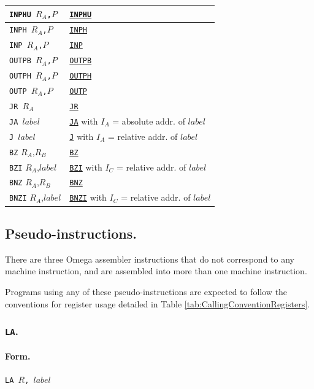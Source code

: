 \documentclass[12pt,english,twoside]{report}
\def\code{\texttt}
\newcommand\machineinst[1]{\hyperref[sec:Ins_#1]{\code{#1}}}
\begin{document}
\begin{center}
\begin{longtable}{l|l}
      \hline
      \code{INPHU $R_A$,$P$} & \machineinst{INPHU}\\
      \hline
      \code{INPH $R_A$,$P$} & \machineinst{INPH}\\
      \hline
      \code{INP $R_A$,$P$} & \machineinst{INP}\\
      \hline
      \code{OUTPB $R_A$,$P$} & \machineinst{OUTPB}\\
      \hline
      \code{OUTPH $R_A$,$P$} & \machineinst{OUTPH}\\
      \hline
      \code{OUTP $R_A$,$P$} & \machineinst{OUTP}\\
      \hline
      \code{JR $R_A$} & \machineinst{JR}\\
      \hline
      \code{JA $\mathit{label}$} & \machineinst{JA} with $I_A$ = absolute addr. of $\mathit{label}$\\
      \hline
      \code{J $\mathit{label}$} & \machineinst{J} with $I_A$ = relative addr. of $\mathit{label}$\\
      \hline
      \code{BZ} $R_A$,$R_B$ & \machineinst{BZ}\\
      \hline
      \code{BZI} $R_A$,$\mathit{label}$ & \machineinst{BZI} with $I_C$ = relative addr. of $\mathit{label}$\\
      \hline
      \code{BNZ} $R_A$,$R_B$ & \machineinst{BNZ}\\
      \hline
      \code{BNZI} $R_A$,$\mathit{label}$ & \machineinst{BNZI} with $I_C$ = relative addr. of $\mathit{label}$\\
      \hline
    \end{longtable}
  \end{center}
  
\subsection{Pseudo-instructions.}

There are three Omega assembler instructions that do not correspond to
any machine instruction, and are assembled into more than one machine
instruction.

Programs using any of these pseudo-instructions are expected to follow
the conventions for register usage detailed in Table
\ref{tab:CallingConventionRegisters}.

\subsubsection*{\label{Asm_LA} \code{LA}.}
\paragraph{Form.} \code{LA $R$, $\mathit{label}$}
\end{document}

